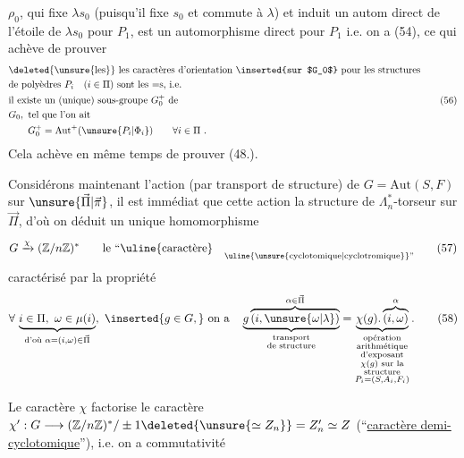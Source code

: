 $\rho_0$, qui fixe $\lambda s_0$ (puisqu'il fixe $s_0$ et commute à $\lambda$) et induit un autom direct de l'étoile de $\lambda s_0$  pour $P_1$, est un automorphisme direct pour $P_1$ i.e. on a (54), ce qui achève de prouver
\[
\begin{aligned}
&\text{\deleted{\unsure{les}} les caractères d'orientation \inserted{sur $G_0$} pour les structures}\\
&\text{de polyèdres }P_i\quad(i\in\Pi)\text{ sont les $=$s, i.e.}\\
&\text{il existe un (unique) sous-groupe }G_0^+\text{ de}\\
&G_0,\text{ tel que l'on ait}\\
&\qquad G_0^+=\mathrm{Aut}^+(\unsure{P_i|\Phi_i})\qquad\forall i\in\Pi\ .
\end{aligned}
\tag*{(56)}
\]
Cela achève en même temps de prouver (48.).

Considérons maintenant l'action (par transport de structure) de $G=\mathrm{Aut}(S,F)$ sur $\unsure{\vec\Pi|\vec\pi}$, il est immédiat que cette action  la  structure de $\Lambda_n^*$-torseur sur $\vec\Pi$, d'où on déduit un unique homomorphisme
\[
G\xrightarrow{\chi}(\mathbb Z/n\mathbb Z)^*\qquad
\text{le ``\uline{caractère}}\quad\substack{\strut\\\text{\uline{\unsure{cyclotomique|cyclotromique}}''}}
\tag*{(57)}
\]
caractérisé par la propriété
\[
\forall\,\underbrace{i\in\Pi,\ \omega\in\mu(i)}_{\text{d'où }\alpha=(i,\omega)\in\vec\Pi},
\ \inserted{g\in G,}\ \text{on a}\quad
\underbrace{g\overbrace{(i,\unsure{\omega|\lambda})}^{\alpha\in\vec\Pi}}_{\substack{\text{transport}\\\text{de structure}}}
=\underbrace{\chi(g).\overbrace{(i,\omega)}^\alpha}_{\substack{\text{opération}\\\text{arithmétique}\\\text{d'exposant}\\
\chi(g)\text{ sur la}\\\text{structure}\\P_i=(S,A_i,F_i)}}.
\tag*{(58)}
\]

Le caractère $\chi$ factorise le caractère $\chi':G\longrightarrow(\mathbb Z/n\mathbb Z)^*/\pm1\deleted{\unsure{\simeq Z_n}}=Z'_n\simeq Z$ (``\uline{caractère demi-cyclotomique}''), i.e. on a commutativité 

